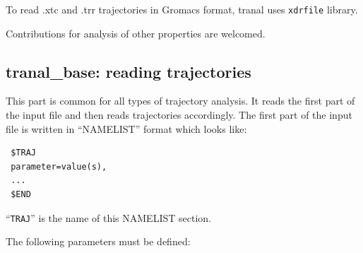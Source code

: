 \documentclass{article}
\begin{document}
To read .xtc and .trr trajectories in Gromacs format, tranal uses \verb|xdrfile|
library. 

Contributions for analysis of other properties are welcomed.


\subsection{tranal\_base: reading trajectories}

This part is common for all types of trajectory analysis. It reads the
first part of the input file and then reads trajectories accordingly. 
The first part of the input file is written in ``NAMELIST'' format
which looks like:

\begin{verbatim}
 $TRAJ
 parameter=value(s),
 ...
 $END
\end{verbatim}

``\verb|TRAJ|'' is the name of this NAMELIST section. 

The following parameters must be defined:
\end{document}
